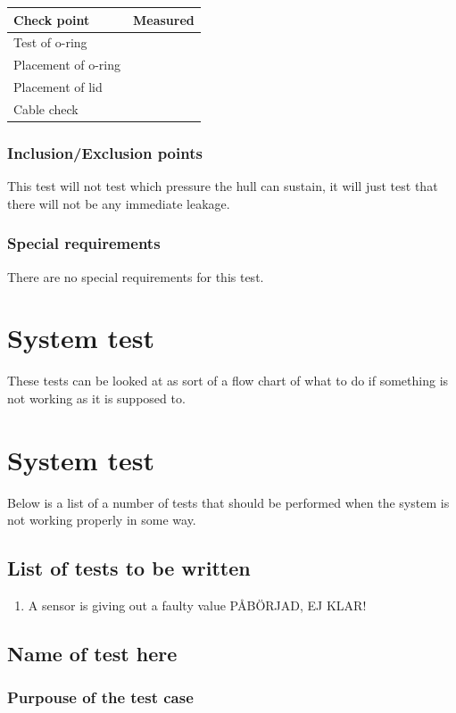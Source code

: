 \documentclass[10pt,a4paper]{article}
\begin{document}
\begin{tabular}{| l | c |}
\hline
Check point & Measured \\ \hline
Test of o-ring &  \\ \hline
Placement of o-ring &  \\ \hline
Placement of lid &  \\ \hline
Cable check & \\ \hline
\end{tabular} 
\subsubsection*{Inclusion/Exclusion points}
This test will not test which pressure the hull can sustain, it will just test that there will not be any immediate leakage. 
\subsubsection*{Special requirements}
There are no special requirements for this test. 

\section*{System test}
These tests can be looked at as sort of a flow chart of what to do if something is not working as it is supposed to. 
\section{System test}
Below is a list of a number of tests that should be performed when the system is not working properly in some way.
\subsection{List of tests to be written}
\begin{enumerate}

\item A sensor is giving out a faulty value PÅBÖRJAD, EJ KLAR! 

\end{enumerate}

\subsection{Name of test here}
\subsubsection*{Purpouse of the test case}
\end{document}
